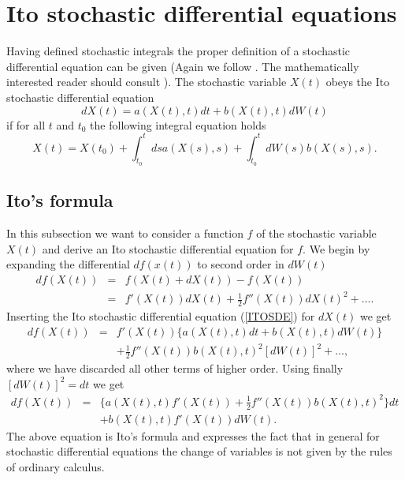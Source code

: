 \section{Ito stochastic differential equations}
Having defined stochastic integrals the proper definition of a
stochastic differential equation can be given (Again we follow 
\cite{gardiner}. The mathematically interested reader should
consult \cite{GARD,KLOEDEN_AN,POTTER}). The stochastic variable
$X(t)$ obeys the Ito stochastic differential equation
\begin{equation}
\label{ITOSDE}
dX(t) = a(X(t),t) dt + b(X(t),t) dW(t)
\end{equation}
if for all $t$ and $t_0$ the following integral equation holds
\begin{equation}
X(t) = X(t_0) + \int_{t_0}^t ds a(X(s),s) 
     + \int_{t_0}^t dW(s) b(X(s),s).
\end{equation}

\subsection{Ito's formula}
In this subsection we want to consider a function
$f$ of the stochastic variable $X(t)$ and derive an Ito stochastic
differential equation for $f$. We begin by expanding the differential 
$df(x(t))$ to second order in $dW(t)$
\begin{eqnarray*}
df(X(t)) & = & f(X(t)+dX(t)) - f(X(t)) \\
         & = & f'(X(t)) dX(t) + \frac{1}{2} f''(X(t)) dX(t)^2 + \ldots.
\end{eqnarray*}
Inserting the Ito stochastic differential equation (\ref{ITOSDE})
for $dX(t)$ we get
\begin{eqnarray*}
df(X(t)) &=&  f'(X(t)) \{a(X(t),t)dt + b(X(t),t) dW(t) \} \\
      & & + \frac{1}{2} f''(X(t)) b(X(t),t)^2 [dW(t)]^2 + \ldots ,
\end{eqnarray*}
where we have discarded all other terms of higher order. Using
finally $[dW(t)]^2 =dt$ we get
\begin{eqnarray}
\label{ITOFORMULA}
df(X(t)) &=& \{a(X(t),t) f'(X(t)) +  \frac{1}{2} f''(X(t)) b(X(t),t)^2
\} dt  \nonumber \\
    & & + b(X(t),t)f'(X(t)) dW(t).
\end{eqnarray}
The above equation is Ito's formula and expresses the fact that 
in general for stochastic differential equations
the change of variables is not given by the rules of 
ordinary calculus.


